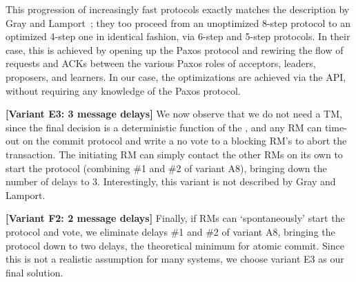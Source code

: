 This progression of increasingly fast protocols exactly matches the description by Gray and Lamport~\cite{gray:2006}; they too proceed from an unoptimized 8-step protocol to an optimized 4-step one in identical fashion, via 6-step and 5-step protocols. In their case, this is achieved by opening up the Paxos protocol and rewiring the flow of requests and ACKs between the various Paxos roles of acceptors, leaders, proposers, and learners. In our case, the optimizations are achieved via the \sysname{} API, without requiring any knowledge of the Paxos protocol.

\textbf{[Variant E3: 3 message delays]} We now observe that we do not need a TM, since the final decision is a deterministic function of the \WORs{}, and any RM can time-out on the commit protocol and write a no vote to a blocking RM's \WOR{} to abort the transaction. The initiating RM can simply contact the other RMs on its own to start the protocol (combining \#1 and \#2 of variant A8), bringing down the number of delays to 3. Interestingly, this variant is not described by Gray and Lamport.


\textbf{[Variant F2: 2 message delays]} Finally, if RMs can `spontaneously' start the protocol and vote, we eliminate delays \#1 and \#2 of variant A8, bringing the protocol down to two delays, the theoretical minimum for atomic commit. Since this is not a realistic assumption for many systems, we choose variant E3 as our final solution.




